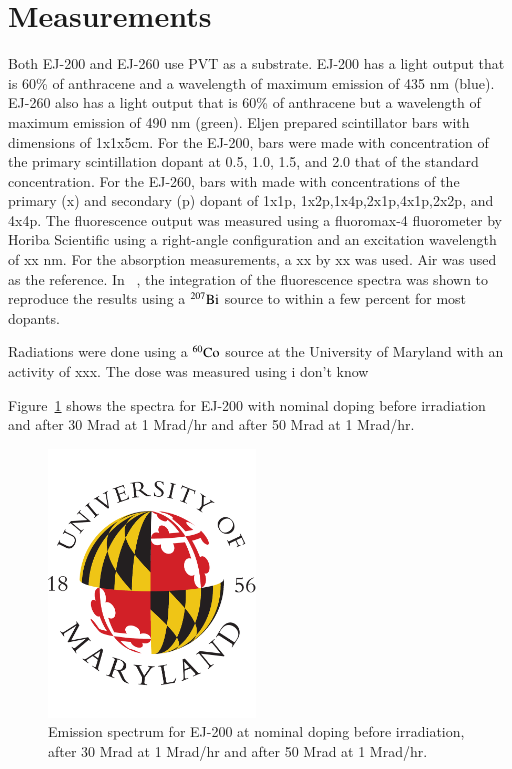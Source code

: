 \documentclass[review]{elsarticle}
\begin{document}
\section{Measurements}
Both EJ-200 and EJ-260 use PVT as a substrate.  EJ-200 has a light output that is 60\% of anthracene and a wavelength of maximum emission of 435 nm (blue).  
EJ-260 also has a light output that is 60\% of anthracene but a wavelength of maximum emission of 490 nm (green).  Eljen prepared scintillator bars
with dimensions of 1x1x5cm.  For the EJ-200, bars were made with concentration of the primary scintillation dopant at 0.5, 1.0, 1.5, and 2.0 that of
the standard concentration.  For the EJ-260, bars with made with concentrations of the primary (x) and secondary (p) dopant of 1x1p, 1x2p,1x4p,2x1p,4x1p,2x2p, and 4x4p.
The fluorescence output was measured using a fluoromax-4 fluorometer by Horiba Scientific using a right-angle configuration and an excitation wavelength of
{\color{red} xx} nm.  For the absorption measurements, a {\color{red} xx} by {\color{red} xx} was used.
Air was used as the reference.  In ~\cite{Bross199135}, the integration
of the fluorescence spectra was shown to reproduce the results using a
$\rm{^{207}Bi}$ source to within a few percent for most dopants.

Radiations were done using a ${\rm ^{60}Co}$ source at the University of Maryland with an activity of {\color{red} xxx}.  
The dose was measured using {\color{red} i don't know}

Figure~\ref{fig:ej200doping1x} shows the spectra for EJ-200 with nominal doping before irradiation and after
30 Mrad at 1 Mrad/hr and after 50 Mrad at 1 Mrad/hr.

\begin{figure}[!ht]
\begin{center}
\includegraphics[width=0.49\textwidth]{./figures/placeholder.pdf}
\caption{
Emission spectrum for EJ-200 at nominal doping before irradiation, after 30 Mrad at 1 Mrad/hr and after 50 Mrad at 1 Mrad/hr.
}
\label{fig:ej200doping1x}
\end{center}
\end{figure}
\end{document}

